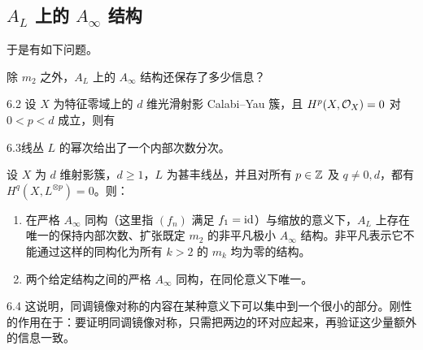 \subsection{\texorpdfstring{$A_L$ 上的 $A_\infty$ 结构}{AL 上的 A∞ 结构}}
于是有如下问题。
\setcounter{prob}{0}\begingroup\renewcommand{\theprob}{\arabic{prob}}\begin{problem}\label{problem:6.1}
除 $m_2$ 之外，$A_L$ 上的 $A_\infty$ 结构还保存了多少信息？
\end{problem}\endgroup
\begin{Note}{6.2}
设 $X$ 为特征零域上的 $d$ 维光滑射影 Calabi--Yau 簇，且 $H^p(X,\mathcal O_X)=0$ 对 $0<p<d$ 成立，则有
\end{Note}
\begin{Note}{6.3}线丛 $L$ 的幂次给出了一个内部次数分次。\end{Note}
\begin{theorem}[Polishchuk]\label{thm:6.4}
设 $X$ 为 $d$ 维射影簇，$d\ge1$，$L$ 为甚丰线丛，并且对所有 $p\in\mathbb Z$ 及 $q\ne0,d$，都有 $H^q(X,L^{\otimes p})=0$。则：
\begin{enumerate}[label=(\roman*)]
\item 在严格 $A_\infty$ 同构（这里指 $(f_n)$ 满足 $f_1=\operatorname{id}$）与缩放的意义下，$A_L$ 上存在唯一的保持内部次数、扩张既定 $m_2$ 的非平凡极小 $A_\infty$ 结构。非平凡表示它不能通过这样的同构化为所有 $k>2$ 的 $m_k$ 均为零的结构。
\item 两个给定结构之间的严格 $A_\infty$ 同构，在同伦意义下唯一。
\end{enumerate}
\end{theorem}
\begin{Note}{6.4}
这说明，同调镜像对称的内容在某种意义下可以集中到一个很小的部分。刚性的作用在于：要证明同调镜像对称，只需把两边的环对应起来，再验证这少量额外的信息一致。
\end{Note}
